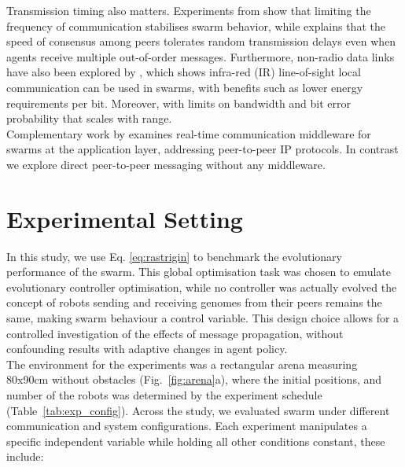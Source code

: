 \documentclass[conference]{IEEEtran}
\begin{document}
Transmission timing also matters. Experiments from \cite{aust_hidden_2022} show that limiting the frequency of communication stabilises swarm behavior, while \cite{tsianos_impact_2012} explains that the speed of consensus among peers tolerates random transmission delays even when agents receive multiple out-of-order messages. Furthermore, non-radio data links have also been explored by \cite{trenkwalder_swarmcom_2020}, which shows infra-red (IR) line-of-sight local communication can be used in swarms, with benefits such as lower energy requirements per bit. Moreover, with limits on bandwidth and bit error probability that scales with range. \\

Complementary work by \cite{rabbah_real_2021} examines real-time communication middleware for swarms at the application layer, addressing peer-to-peer IP protocols. In contrast we explore direct peer-to-peer messaging without any middleware. \\


\section{Experimental Setting}

In this study, we use Eq. \ref{eq:rastrigin} to benchmark the evolutionary performance of the swarm. This global optimisation task was chosen to emulate evolutionary controller optimisation, while no controller was actually evolved the concept of robots sending and receiving genomes from their peers remains the same, making swarm behaviour a control variable. This design choice allows for a controlled investigation of the effects of message propagation, without confounding results with adaptive changes in agent policy. \\

The environment for the experiments was a rectangular arena measuring 80x90cm without obstacles (Fig.~\ref{fig:arena}a), where the initial positions, and number of the robots was determined by the experiment schedule (Table~\ref{tab:exp_config}). Across the study, we evaluated swarm under different communication and system configurations. Each experiment manipulates a specific independent variable while holding all other conditions constant, these include:\\
\end{document}

